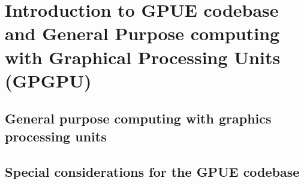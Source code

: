 
\chapter{Introduction to GPUE codebase and General Purpose computing with Graphical Processing Units (GPGPU)} \label{ch-gpu}

\section{General purpose computing with graphics processing units}
\section{Special considerations for the GPUE codebase}
